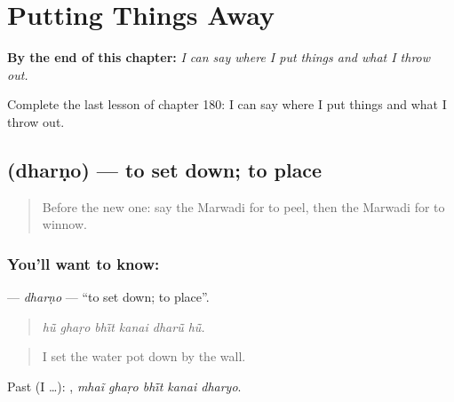
\chapter{Putting Things Away}
\label{ch:mw-putting-things-away}

\begin{chapteropening}
\textbf{By the end of this chapter:} \emph{I can say where I put things and what I throw out.}

Complete the last lesson of chapter 180: I can say where I put things and what I throw out.
\end{chapteropening}

\section[\texorpdfstring{\mw{धरणो} (dharṇo)}{धरणो (dharṇo)}]{ (dharṇo) — to set down; to place}

\label{lesson:MW-C180-dharno}



\begin{quote}
Before the new one: say the Marwadi for to peel, then the Marwadi for to winnow.
\end{quote}

\subsection*{You'll want to know: }
\textbf{} — \emph{dharṇo} — \textquotedblleft{}to set down; to place\textquotedblright{}.

\begin{quote}
     
\end{quote}

\begin{quote}
\emph{hū̃ ghaṛo bhī̃t kanai dharū̃ hū̃.}
\end{quote}

\begin{quote}
I set the water pot down by the wall.
\end{quote}

Past (I …):     , \emph{mhaĩ ghaṛo bhī̃t kanai dharyo}.

